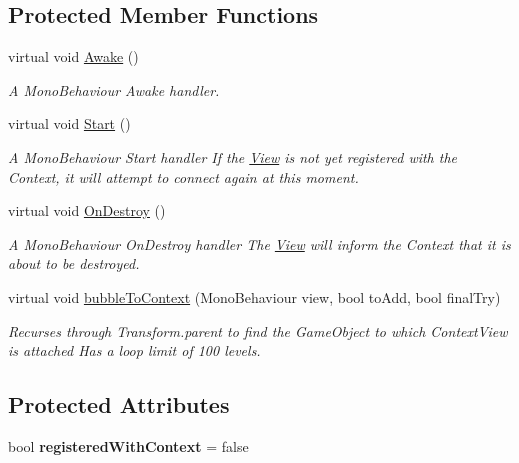\subsection*{Protected Member Functions}
\begin{DoxyCompactItemize}
\item 
virtual void \hyperlink{classstrange_1_1extensions_1_1mediation_1_1impl_1_1_view_ac8f8bc798a6729e44cc4f8d6dc3ee838}{Awake} ()
\begin{DoxyCompactList}\small\item\em A Mono\-Behaviour Awake handler. \end{DoxyCompactList}\item 
virtual void \hyperlink{classstrange_1_1extensions_1_1mediation_1_1impl_1_1_view_a9a876bf06590c1a1bacb243311489500}{Start} ()
\begin{DoxyCompactList}\small\item\em A Mono\-Behaviour Start handler If the \hyperlink{classstrange_1_1extensions_1_1mediation_1_1impl_1_1_view}{View} is not yet registered with the Context, it will attempt to connect again at this moment. \end{DoxyCompactList}\item 
virtual void \hyperlink{classstrange_1_1extensions_1_1mediation_1_1impl_1_1_view_a373a95c35d2d86746ed5db0512222767}{On\-Destroy} ()
\begin{DoxyCompactList}\small\item\em A Mono\-Behaviour On\-Destroy handler The \hyperlink{classstrange_1_1extensions_1_1mediation_1_1impl_1_1_view}{View} will inform the Context that it is about to be destroyed. \end{DoxyCompactList}\item 
virtual void \hyperlink{classstrange_1_1extensions_1_1mediation_1_1impl_1_1_view_a77b15b992a40cf3bfbf6d17c6f933a9c}{bubble\-To\-Context} (Mono\-Behaviour view, bool to\-Add, bool final\-Try)
\begin{DoxyCompactList}\small\item\em Recurses through Transform.\-parent to find the Game\-Object to which Context\-View is attached Has a loop limit of 100 levels. \end{DoxyCompactList}\end{DoxyCompactItemize}
\subsection*{Protected Attributes}
\begin{DoxyCompactItemize}
\item 
\hypertarget{classstrange_1_1extensions_1_1mediation_1_1impl_1_1_view_a08f38be9f2708de9af4eaabf6c7dcb4c}{bool {\bfseries registered\-With\-Context} = false}\label{classstrange_1_1extensions_1_1mediation_1_1impl_1_1_view_a08f38be9f2708de9af4eaabf6c7dcb4c}

\end{DoxyCompactItemize}


